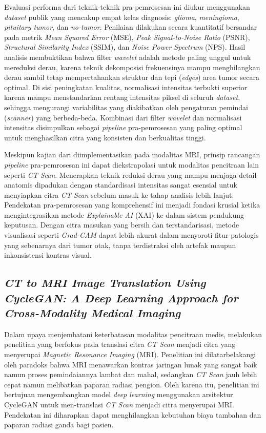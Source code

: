 Evaluasi performa dari teknik-teknik pra-pemrosesan ini diukur menggunakan \textit{dataset} publik yang mencakup empat kelas diagnosis: \textit{glioma}, \textit{meningioma}, \textit{pituitary tumor}, dan \textit{no-tumor}. Penilaian dilakukan secara kuantitatif bersandar pada metrik \textit{Mean Squared Error} (MSE), \textit{Peak Signal-to-Noise Ratio} (PSNR), \textit{Structural Similarity Index} (SSIM), dan \textit{Noise Power Spectrum} (NPS). Hasil analisis membuktikan bahwa filter \textit{wavelet} adalah metode paling unggul untuk mereduksi derau, karena teknik dekomposisi frekuensinya mampu menghilangkan derau sambil tetap mempertahankan struktur dan tepi (\textit{edges}) area tumor secara optimal. Di sisi peningkatan kualitas, normalisasi intensitas terbukti superior karena mampu menstandarkan rentang intensitas piksel di seluruh \textit{dataset}, sehingga mengurangi variabilitas yang diakibatkan oleh pengaturan pemindai (\textit{scanner}) yang berbeda-beda. Kombinasi dari filter \textit{wavelet} dan normalisasi intensitas disimpulkan sebagai \textit{pipeline} pra-pemrosesan yang paling optimal untuk menghasilkan citra yang konsisten dan berkualitas tinggi.

Meskipun kajian dari \textcite{flower2025performance} diimplementasikan pada modalitas MRI, prinsip rancangan \textit{pipeline} pra-pemrosesan ini dapat diekstrapolasi untuk modalitas pencitraan lain seperti \textit{CT Scan}. Menerapkan teknik reduksi derau yang mampu menjaga detail anatomis dipadukan dengan standardisasi intensitas sangat esensial untuk menyiapkan citra \textit{CT Scan} sebelum masuk ke tahap analisis lebih lanjut. Pendekatan pra-pemrosesan yang komprehensif ini menjadi fondasi krusial ketika mengintegrasikan metode \textit{Explainable AI} (XAI) ke dalam sistem pendukung keputusan. Dengan citra masukan yang bersih dan terstandarisasi, metode visualisasi seperti \textit{Grad-CAM} dapat lebih akurat dalam menyoroti fitur patologis yang sebenarnya dari tumor otak, tanpa terdistraksi oleh artefak maupun inkonsistensi kontras visual.

\subsection{\textit{CT to MRI Image Translation Using CycleGAN: A Deep Learning Approach for Cross-Modality Medical Imaging}}

Dalam upaya menjembatani keterbatasan modalitas pencitraan medis, \textcite{Jha2024CTtoMRI} melakukan penelitian yang berfokus pada translasi citra \textit{CT Scan} menjadi citra yang menyerupai \textit{Magnetic Resonance Imaging} (MRI). Penelitian ini dilatarbelakangi oleh paradoks bahwa MRI menawarkan kontras jaringan lunak yang sangat baik namun proses pemindaiannya lambat dan mahal, sedangkan \textit{CT Scan} jauh lebih cepat namun melibatkan paparan radiasi pengion. Oleh karena itu, penelitian ini bertujuan mengembangkan model \textit{deep learning} menggunakan arsitektur CycleGAN untuk men-translasi \textit{CT Scan} menjadi citra menyerupai MRI. Pendekatan ini diharapkan dapat menghilangkan kebutuhan biaya tambahan dan paparan radiasi ganda bagi pasien.


